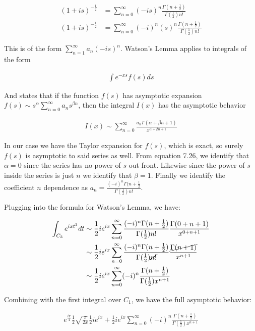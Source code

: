 \documentclass[paper=a4, fontsize=11pt]{scrartcl} %
\numberwithin{equation}{section} %
\numberwithin{figure}{section} %
\numberwithin{table}{section} %
\begin{document}
\begin{align}
(1 + is)^{-\frac{1}{2}} &= \sum_{n=0}^{\infty}(-is)^n \frac{\Gamma(n + \frac{1}{2})}{\Gamma(\frac{1}{2}) n!} \\  
(1 + is)^{-\frac{1}{2}} &= \sum_{n=0}^{\infty}(-i)^n(s)^n \frac{\Gamma(n + \frac{1}{2})}{\Gamma(\frac{1}{2}) n!}   
\end{align} 

This is of the form $\sum_{n=1}^{\infty} a_n (-is)^n$. Watson's Lemma applies to integrals of the form

\begin{align}
\int e^{-xs}f(s)ds
\end{align}

And states that if the function $f(s)$ has asymptotic expansion $f(s) \sim s^{\alpha} \sum_{n=0}^{\infty} a_n s^{\beta n}$, then the integral $I(x)$ has the asymptotic behavior

\begin{align}
I(x) \sim \sum_{n=0}^{\infty} \frac{a_n \Gamma( \alpha + \beta n + 1)}{x^{\alpha + \beta n + 1}}
\end{align}

In our case we have the Taylor expansion for $f(s)$, which is exact, so surely $f(s)$ is asymptotic to said series as well. From equation 7.26, we identify that $\alpha = 0$ since the series  has no power of $s$ out front. Likewise since the power of $s$ inside the series is just $n$ we identify that $\beta = 1$. Finally we identify the coefficient $n$ dependence as $a_n = \frac{(-i)^n \Gamma(n + \frac{1}{2}}{\Gamma(\frac{1}{2}) n!}$. 


Plugging into the formula for Watson's Lemma, we have: 

\begin{align}
\int_{C_3} e^{i x t^2} dt &\sim \frac{1}{2}i e^{ix} \sum_{n=0}^{\infty} \frac{(-i)^n \Gamma(n + \frac{1}{2})}{\Gamma(\frac{1}{2}) n!} \frac{\Gamma(0 + n + 1)}{x^{0 + n + 1}} \\
&\sim \frac{1}{2}i e^{ix} \sum_{n=0}^{\infty} \frac{(-i)^n \Gamma(n + \frac{1}{2})}{\Gamma(\frac{1}{2}) \cancel{n!}} \frac{\cancel{\Gamma(n + 1)}}{x^{n + 1}} \\
&\sim \frac{1}{2}i e^{ix} \sum_{n=0}^{\infty} (-i)^n \frac{\Gamma(n + \frac{1}{2})}{\Gamma(\frac{1}{2}) x^{n+1}}
\end{align}

Combining with the first integral over $C_1$, we have the full asymptotic behavior:

\begin{align}
e^{\frac{i \pi}{4}} \frac{1}{2} \sqrt{\frac{\pi}{2x}} \frac{1}{2}i e^{ix} + \frac{1}{2} i e^{ix} \sum_{n=0}^{\infty} (-i)^n \frac{\Gamma(n + \frac{1}{2})}{\Gamma(\frac{1}{2}) x^{n+1}}
\end{align}



\end{document}
